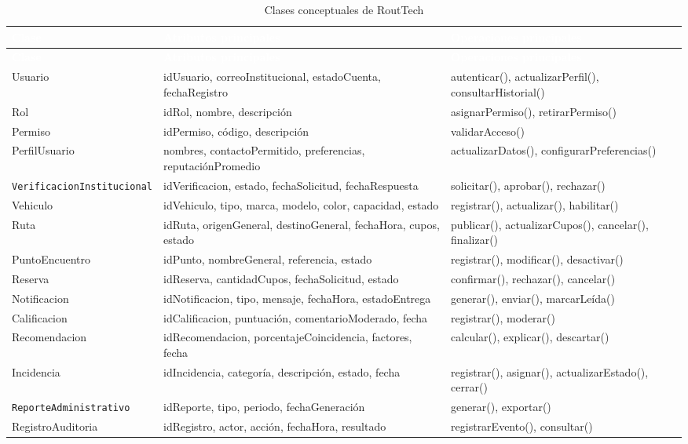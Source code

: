 \documentclass[12pt,a4paper]{article}
\begin{document}
\begin{longtable}{L{3.10cm} L{5.20cm} L{5.30cm}}
\caption{Clases conceptuales de RoutTech}\label{tab:clases-conceptuales}\\
\textcolor{white}{\textbf{Clase}} &
\textcolor{white}{\textbf{Atributos principales}} &
\textcolor{white}{\textbf{Operaciones principales}}\\
\endfirsthead
{}
\textcolor{white}{\textbf{Clase}} &
\textcolor{white}{\textbf{Atributos principales}} &
\textcolor{white}{\textbf{Operaciones principales}}\\
\endhead
Usuario & idUsuario, correoInstitucional, estadoCuenta, fechaRegistro & autenticar(), actualizarPerfil(), consultarHistorial()\\
Rol & idRol, nombre, descripción & asignarPermiso(), retirarPermiso()\\
Permiso & idPermiso, código, descripción & validarAcceso()\\
PerfilUsuario & nombres, contactoPermitido, preferencias, reputaciónPromedio & actualizarDatos(), configurarPreferencias()\\
\texttt{Verificacion\allowbreak Institucional} & idVerificacion, estado, fechaSolicitud, fechaRespuesta & solicitar(), aprobar(), rechazar()\\
Vehiculo & idVehiculo, tipo, marca, modelo, color, capacidad, estado & registrar(), actualizar(), habilitar()\\
Ruta & idRuta, origenGeneral, destinoGeneral, fechaHora, cupos, estado & publicar(), actualizarCupos(), cancelar(), finalizar()\\
PuntoEncuentro & idPunto, nombreGeneral, referencia, estado & registrar(), modificar(), desactivar()\\
Reserva & idReserva, cantidadCupos, fechaSolicitud, estado & confirmar(), rechazar(), cancelar()\\
Notificacion & idNotificacion, tipo, mensaje, fechaHora, estadoEntrega & generar(), enviar(), marcarLeída()\\
Calificacion & idCalificacion, puntuación, comentarioModerado, fecha & registrar(), moderar()\\
Recomendacion & idRecomendacion, porcentajeCoincidencia, factores, fecha & calcular(), explicar(), descartar()\\
Incidencia & idIncidencia, categoría, descripción, estado, fecha & registrar(), asignar(), actualizarEstado(), cerrar()\\
\texttt{Reporte\allowbreak Administrativo} & idReporte, tipo, periodo, fechaGeneración & generar(), exportar()\\
RegistroAuditoria & idRegistro, actor, acción, fechaHora, resultado & registrarEvento(), consultar()\\
\end{longtable}
\end{document}
